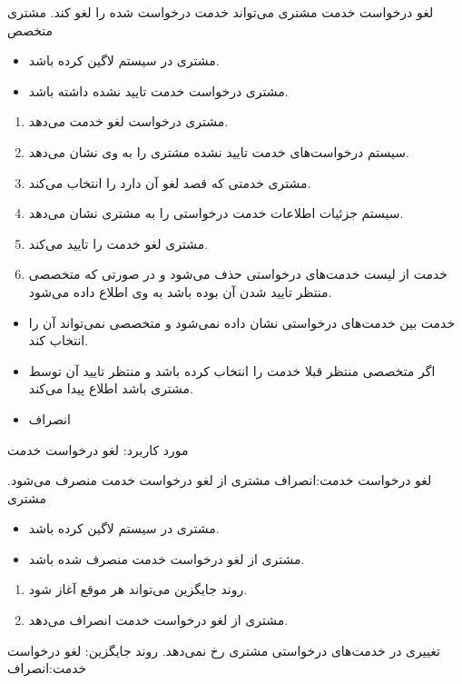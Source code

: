 \usecase
{
	لغو درخواست خدمت
}
{}
{
	مشتری می‌تواند خدمت درخواست شده را لغو کند.
}
{
مشتری
}
{
	متخصص
}
{
	\begin{itemize}
		\vspace*{-0.6cm}
\item 
مشتری در سیستم لاگین کرده باشد.
\item 
مشتری درخواست خدمت تایید نشده داشته باشد.
	\end{itemize}
}
{
	\vspace*{-0.6cm}
	\begin{enumerate}
\item 
مشتری درخواست لغو خدمت می‌دهد.
\item
سیستم درخواست‌های خدمت تایید نشده مشتری را به وی نشان می‌دهد. 
\item
مشتری خدمتی که قصد لغو آن دارد را انتخاب می‌کند.
\item
سیستم جزئیات اطلاعات خدمت درخواستی را به مشتری نشان می‌دهد.
\item
مشتری لغو خدمت را تایید می‌کند.
\item
خدمت از لیست خدمت‌های درخواستی حذف می‌شود و در صورتی که متخصصی منتظر تایید شدن آن بوده باشد به وی اطلاع داده می‌شود.
	\end{enumerate}
}
{
		\begin{itemize}
		\vspace*{-0.6cm}
		\item 
خدمت بین خدمت‌های درخواستی نشان داده نمی‌شود و متخصصی نمی‌تواند آن را انتخاب کند.
		\item 
اگر متخصصی منتظر قبلا خدمت را انتخاب کرده باشد و منتظر تایید آن توسط مشتری باشد اطلاع پیدا می‌کند.
	\end{itemize}

}
{
			\begin{itemize}
		\vspace*{-0.6cm}
		\item
انصراف
\end{itemize}
}
{
	مورد کاربرد: لغو درخواست خدمت
}




\alternativeflow
{
	لغو درخواست خدمت:انصراف
}
{}
{
	مشتری از لغو درخواست خدمت منصرف می‌شود.
}
{
	مشتری
}
{}
{
	\begin{itemize}
		\vspace*{-0.6cm}
		\item 
		مشتری در سیستم لاگین کرده باشد.
		\item
		مشتری از لغو درخواست خدمت منصرف شده باشد.
	\end{itemize}
}
{
	\vspace*{-0.6cm}
	\begin{enumerate}
		\item 
		روند جایگزین می‌تواند هر موقع آغاز شود.
		\item
		مشتری از لغو درخواست خدمت انصراف می‌دهد.
	\end{enumerate}
}
{
تغییری در خدمت‌های درخواستی مشتری رخ نمی‌دهد.
}
{
	روند جایگزین: لغو درخواست خدمت:انصراف
}

